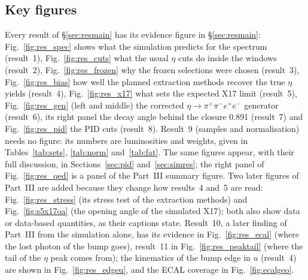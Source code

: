 \documentclass[11pt,a4paper]{article}
\newcommand{\ppee}{\ensuremath{\pi^{+}\pi^{-}e^{+}e^{-}}\xspace}
\begin{document}
\subsection{Key figures}
\label{sec:resfig}
Every result of \S\ref{sec:resmain} has its evidence figure in \S\ref{sec:resmain}: Fig.~\ref{fig:res_spec} shows what the
simulation predicts for the spectrum (result~1), Fig.~\ref{fig:res_cuts} what the usual $\eta$ cuts do inside the
windows (result~2), Fig.~\ref{fig:res_frozen} why the frozen selections were chosen (result~3), Fig.~\ref{fig:res_bias}
how well the planned extraction methods recover the true $\eta$ yields (result~4), Fig.~\ref{fig:res_x17} what sets
the expected X17 limit (result~5), Fig.~\ref{fig:res_gen} (left and middle) the corrected $\eta\to\ppee$ generator
(result~6), its right panel the decay angle behind the closure 0.891 (result~7) and Fig.~\ref{fig:res_pid} the PID cuts
(result~8). Result~9 (samples and normalisation) needs no figure: its numbers are luminosities and weights, given in
Tables~\ref{tab:sets}, \ref{tab:norm} and~\ref{tab:fat}. The same figures appear, with their full discussion, in
Sections~\ref{sec:pid} and~\ref{sec:simres}; the right panel of Fig.~\ref{fig:res_qed} is a panel of the Part~III summary
figure. Two later figures of Part~III are added because they change how results~4 and~5 are read:
Fig.~\ref{fig:res_stress} (its stress test of the extraction methods) and Fig.~\ref{fig:s5x17oa} (the opening angle of
the simulated X17); both also show data or data-based quantities, as their captions state. Result~10, a later finding of
Part~III from the simulation alone, has its evidence in Fig.~\ref{fig:res_ecal} (where the lost photon of the bump goes),
result~11 in Fig.~\ref{fig:res_peaktail} (where the tail of the $\eta$ peak comes from);
the kinematics of the bump edge in $u$ (result~4) are shown in Fig.~\ref{fig:res_edgeu}, and the ECAL coverage in
Fig.~\ref{fig:ecalgeo}.
\end{document}
